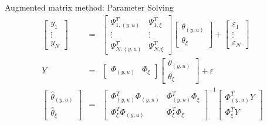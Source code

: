\begin{frame}{ Augmented matrix method: Parameter Solving }
\begin{eqnarray*}
\begin{bmatrix} y_1 \\ \vdots \\ y_{N} \end{bmatrix}&=& 
\begin{bmatrix} \Psi_{1,(y,u)}^T & \Psi_{1,\xi}^T  \\
\vdots & \vdots \\
\Psi_{N,(y,u)}^T & \Psi_{N,\xi}^T
\end{bmatrix} \begin{bmatrix}\theta_{(y,u)} \\ \theta_\xi \end{bmatrix} + 
\begin{bmatrix} \varepsilon_1 \\ \vdots \\ \varepsilon_N \end{bmatrix}\\
Y &=& \begin{bmatrix} \Phi_{(y,u)} & \Phi_\xi \end{bmatrix} \begin{bmatrix}\theta_{(y,u)} \\ \theta_\xi \end{bmatrix} + \varepsilon \\
\begin{bmatrix}\hat\theta_{(y,u)} \\ \hat\theta_\xi \end{bmatrix} &=& \begin{bmatrix}\Phi_{(y,u)}^T\Phi_{(y,u)} & \Phi_{(y,u)}^T\Phi_\xi \\ \Phi_\xi^T\Phi_{(y,u)} & \Phi_\xi^T\Phi_\xi \end{bmatrix}^{-1}\begin{bmatrix}\Phi_{(y,u)}^T Y \\ \Phi_\xi^T Y\end{bmatrix}
\end{eqnarray*}
\end{frame}

